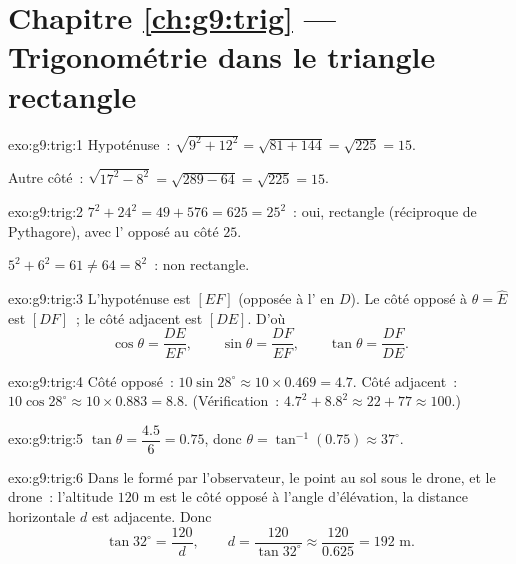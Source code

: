 \section*{Chapitre \ref{ch:g9:trig} --- Trigonométrie dans le triangle rectangle}

\begin{solution}{exo:g9:trig:1}
Hypoténuse~: $\sqrt{9^2 + 12^2} = \sqrt{81 + 144} = \sqrt{225} = 15$.

Autre côté~: $\sqrt{17^2 - 8^2} = \sqrt{289 - 64} = \sqrt{225} = 15$.
\end{solution}

\begin{solution}{exo:g9:trig:2}
$7^2 + 24^2 = 49 + 576 = 625 = 25^2$~: oui, rectangle (réciproque de
Pythagore), avec l' opposé au côté $25$.

$5^2 + 6^2 = 61 \neq 64 = 8^2$~: non rectangle.
\end{solution}

\begin{solution}{exo:g9:trig:3}
L'hypoténuse est $[EF]$ (opposée à l' en $D$). Le côté
opposé à $\theta = \widehat E$ est $[DF]$~; le côté adjacent est
$[DE]$. D'où
\[
\cos\theta = \frac{DE}{EF}, \qquad
\sin\theta = \frac{DF}{EF}, \qquad
\tan\theta = \frac{DF}{DE}.
\]
\end{solution}

\begin{solution}{exo:g9:trig:4}
Côté opposé~: $10 \sin 28^\circ \approx 10 \times 0.469 = 4.7$.
Côté adjacent~: $10 \cos 28^\circ \approx 10 \times 0.883 = 8.8$.
(Vérification~: $4.7^2 + 8.8^2 \approx 22 + 77 \approx 100$.)
\end{solution}

\begin{solution}{exo:g9:trig:5}
$\tan\theta = \dfrac{4.5}{6} = 0.75$, donc
$\theta = \tan^{-1}(0.75) \approx 37^\circ$.
\end{solution}

\begin{solution}{exo:g9:trig:6}
Dans le  formé par l'observateur, le point au sol sous
le drone, et le drone~: l'altitude $120$ m est le côté opposé à l'angle
d'élévation, la distance horizontale $d$ est adjacente. Donc
\[
\tan 32^\circ = \frac{120}{d},
\qquad
d = \frac{120}{\tan 32^\circ} \approx \frac{120}{0.625} = 192 \text{ m}.
\]
\end{solution}

